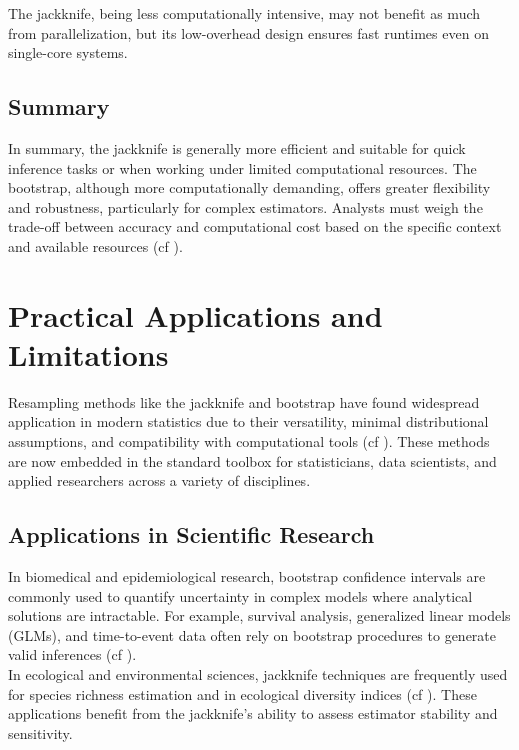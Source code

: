 \documentclass[aodsor,preprint]{imsart}
\numberwithin{equation}{section}
\theoremstyle{plain}
\begin{document}
The jackknife, being less computationally intensive, may not benefit as much from parallelization, but its low-overhead design ensures fast runtimes even on single-core systems.\\

\subsection{Summary}

In summary, the jackknife is generally more efficient and suitable for quick inference tasks or when working under limited computational resources. The bootstrap, although more computationally demanding, offers greater flexibility and robustness, particularly for complex estimators. Analysts must weigh the trade-off between accuracy and computational cost based on the specific context and available resources (cf \cite{efron1982jackknife,efron1993introduction,shao1995jackknife,davison1997bootstrap}).\\

\section{Practical Applications and Limitations}

Resampling methods like the jackknife and bootstrap have found widespread application in modern statistics due to their versatility, minimal distributional assumptions, and compatibility with computational tools (cf \cite{efron1993introduction,davison1997bootstrap,shao1995jackknife}). These methods are now embedded in the standard toolbox for statisticians, data scientists, and applied researchers across a variety of disciplines.\\

\subsection{Applications in Scientific Research}

In biomedical and epidemiological research, bootstrap confidence intervals are commonly used to quantify uncertainty in complex models where analytical solutions are intractable. For example, survival analysis, generalized linear models (GLMs), and time-to-event data often rely on bootstrap procedures to generate valid inferences (cf \cite{davison1997bootstrap,efron1993introduction}).\\

In ecological and environmental sciences, jackknife techniques are frequently used for species richness estimation and in ecological diversity indices (cf \cite{shao1995jackknife}). These applications benefit from the jackknife's ability to assess estimator stability and sensitivity.\\
\end{document}
